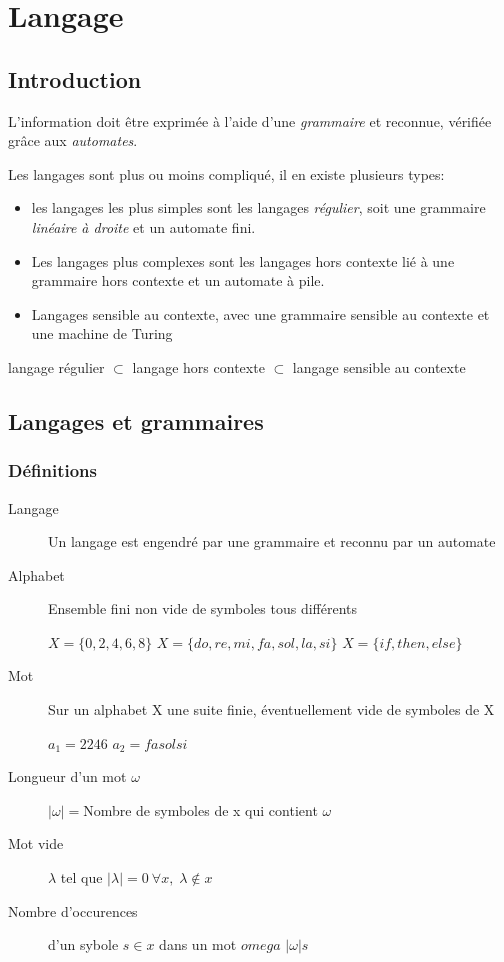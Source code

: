 	\chapter{Langage}
	\section{Introduction}
	L'information doit être exprimée à l'aide d'une \textit{grammaire} et reconnue, vérifiée grâce aux \textit{automates}.

	Les langages sont plus ou moins compliqué, il en existe plusieurs types: 
	\begin{itemize}
		\item les langages les plus simples sont les langages \textit{régulier}, soit une grammaire \textit{linéaire à droite} et un
	automate fini.
		\item Les langages plus complexes sont les langages hors contexte lié à une grammaire hors contexte et un automate à pile.
		\item Langages sensible au contexte, avec une grammaire sensible au contexte et une machine de Turing
	\end{itemize}
	\begin{remarque}
		langage régulier $\subset$ langage hors contexte $\subset$ langage sensible au contexte 
	\end{remarque}

	\section{Langages et grammaires}
	\subsection{Définitions}
	\begin{description}
		\item[Langage] Un langage est engendré par une grammaire et reconnu par un automate	
		\item[Alphabet] Ensemble fini non vide de symboles tous différents
			\begin{exemple}
				$X = \{0,2,4,6,8\}$ $X=\{do, re, mi, fa, sol, la, si\}$ $X=\{if, then, else\}$	
			\end{exemple}
		\item[Mot] Sur un alphabet X une suite finie, éventuellement vide de symboles de X
			\begin{exemple}
				$a_1 = 2246$ $a_2 = fasolsi$
			\end{exemple}
		\item[Longueur d'un mot $\omega$] $|\omega|=$Nombre de symboles de x qui contient $\omega$
		\item[Mot vide] $\lambda$ tel que $|\lambda|=0\ \forall x,\; \lambda \not\in x$
		\item[Nombre d'occurences] d'un sybole $s\in x$ dans un mot $omega$ $|\omega|s$
	\end{description}
